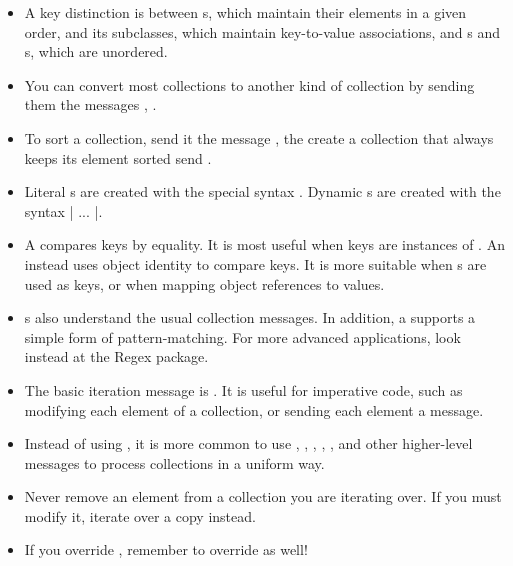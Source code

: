 \documentclass[a4paper,10pt,twoside]{book}
\begin{document}
\begin{itemize}
  \item A key distinction is between s, which maintain their elements in a given order,  and its subclasses, which maintain key-to-value associations, and s and s, which are unordered.
  \item You can convert most collections to another kind of collection by sending them the messages ,  \etc.
  \item To sort a collection, send it the message , the create a collection that always keeps its element sorted send .
  \item Literal s are created with the special syntax .
  Dynamic s are created with the syntax \ct|{ ... }|.
  \item A  compares keys by equality.
  It is most useful when keys are instances of . An  instead uses object identity to compare keys.
  It is more suitable when s are used as keys, or when mapping object references to values.
  \item {}s also understand the usual collection messages.
  In addition, a  supports a simple form of pattern-matching.
  For more advanced applications, look instead at the Regex package.
  \item The basic iteration message is .
  It is useful for imperative code, such as modifying each element of a collection, or sending each element a message.
  \item Instead of using , it is more common to use , , , , , and other higher-level messages to process collections in a uniform way.
  \item Never remove an element from a collection you are iterating over.
  If you must modify it, iterate over a copy instead.
  \item If you override \ct{=}, remember to override  as well!
\end{itemize}

\ifx\wholebook\relax\else
   
   
\end{document}
